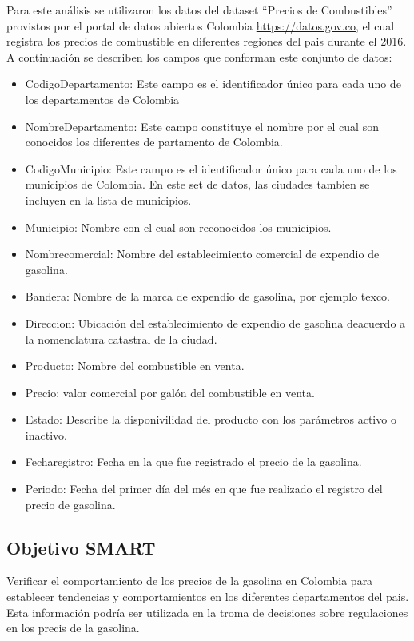 Para este análisis se utilizaron los datos  del dataset “Precios de Combustibles” provistos por el portal de datos abiertos Colombia \href{https://datos.gov.co}{https://datos.gov.co}, el cual registra los precios de combustible en diferentes regiones del pais durante el 2016. A continuación se describen los campos que conforman este conjunto de datos: 
 \begin{itemize}
  \item{CodigoDepartamento:} Este campo es el identificador único para cada uno de los departamentos de Colombia
  \item{NombreDepartamento:} Este campo constituye el nombre por el cual son conocidos los diferentes de partamento de Colombia. 
  \item{CodigoMunicipio:} Este campo es el identificador único para cada uno de los municipios de Colombia. En este set de datos, las ciudades tambien se incluyen en la lista de municipios. 
  \item{Municipio:} Nombre con el cual son reconocidos los municipios.	
  \item{Nombrecomercial:} Nombre del establecimiento comercial de expendio de gasolina. 
  \item{Bandera: } Nombre de la marca de expendio de gasolina, por ejemplo texco. 
  \item{Direccion:} Ubicación del establecimiento  de expendio de gasolina deacuerdo a la nomenclatura catastral de la ciudad. 
  \item{Producto:} Nombre del combustible en venta.
  \item{Precio:} valor comercial por galón del combustible en venta.
  \item{Estado:} Describe la disponivilidad del producto con los parámetros activo o inactivo.
  \item{Fecharegistro:} Fecha en la que fue registrado el precio de la gasolina.
  \item{Periodo:} Fecha del primer día del més en que fue realizado el registro del precio de gasolina.
 \end{itemize}
 \subsection{Objetivo SMART}
 Verificar el comportamiento de los precios de la gasolina en Colombia para establecer tendencias y comportamientos en los diferentes departamentos del pais.\\ Esta información podría ser utilizada en la troma de decisiones sobre regulaciones en los precis de la gasolina.
